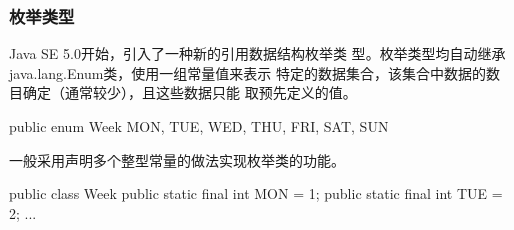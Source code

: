\begin{frame}[fragile] %
  \frametitle{枚举类型}

  \begin{block}{}
    Java SE 5.0开始，引入了一种新的引用数据结构{\hei\Red 枚举类
      型}。{\kai 枚举类型均自动继承java.lang.Enum类，使用一组常量值来表示
      特定的数据集合，该集合中数据的数目确定（通常较少），且这些数据只能
      取预先定义的值。}
  \end{block}

  \pause
  \begin{javaCode}
    public enum Week {
      MON, TUE, WED, THU, FRI, SAT, SUN
    }
  \end{javaCode}
  \pause

  一般采用声明多个整型常量的做法实现枚举类的功能。

  \begin{javaCode}
    public class Week {
      public static final int MON = 1;
      public static final int TUE = 2;
      ...
    }    
  \end{javaCode}
\end{frame}



